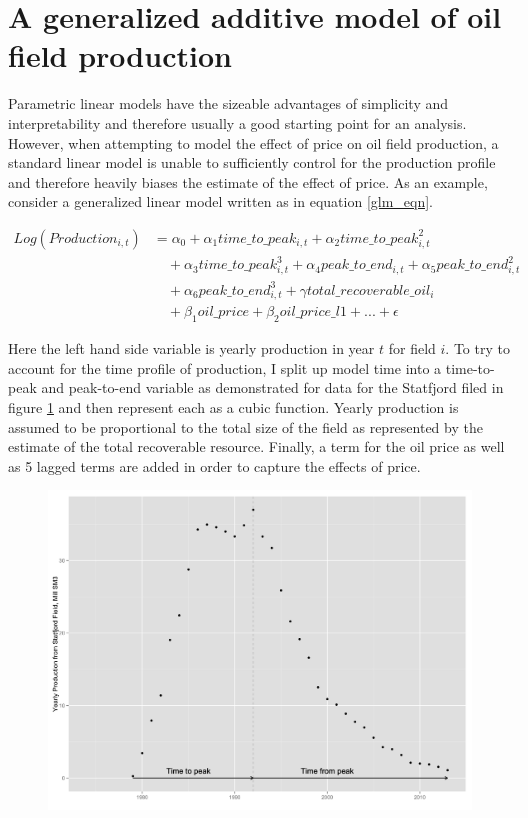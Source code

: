 \documentclass[12pt]{scrartcl} %
\begin{document}
\section{A generalized additive model of oil field production}
Parametric linear models have the sizeable advantages of simplicity and interpretability and therefore usually a good starting point for an analysis.  However, when attempting to model the effect of price on oil field production, a standard linear model is unable to sufficiently control for the production profile and therefore heavily biases the estimate of the effect of price.  As an example, consider a generalized linear model written as in equation \ref{glm_eqn}. 

	\begin{equation}
	\begin{split}
	 Log(Production_{i,t}) & = \alpha_0 + \alpha_1 time\_to\_peak_{i,t} + \alpha_2 time\_to\_peak_{i,t}^2 \\
	& \quad + \alpha_3 time\_to\_peak_{i,t}^3  + \alpha_4 peak\_to\_end_{i,t} + \alpha_5 peak\_to\_end_{i,t}^2 \\
	& \quad + \alpha_6 peak\_to\_end_{i,t}^3 + \gamma total\_recoverable\_oil_i \\
	& \quad + \beta_1 oil\_price + \beta_2 oil\_price\_l1 + ...+ \epsilon
	\end{split}
\label{glm_eqn}
	\end{equation}

Here the left hand side variable is yearly production in year $t$ for field $i$.  To try to account for the time profile of production, I split up model time into a time-to-peak and peak-to-end variable as demonstrated for data for the Statfjord filed in figure \ref{statfjord_dem} and then represent each as a cubic function.  Yearly production is assumed to be proportional to the total size of the field as represented by the estimate of the total recoverable resource.  Finally, a term for the oil price as well as 5 lagged terms are added in order to capture the effects of price.  

\begin{figure}
\includegraphics[width=.8\textwidth]{statfjord_dem.png}
\caption{}
\label{statfjord_dem}
\end{figure}
\end{document}
